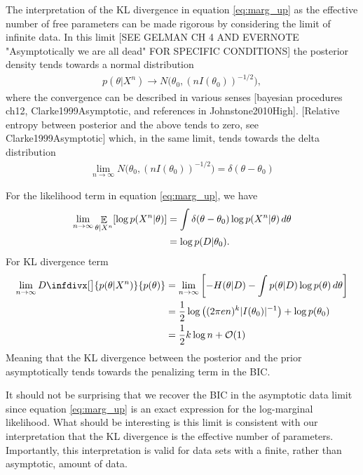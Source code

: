 \documentclass[10pt,a4paper]{article}
\DeclareMathOperator{\EX}{\mathbb{E}}%
\newcommand{\infdiv}{D\infdivx}
\begin{document}
The interpretation of the KL divergence in equation \ref{eq:marg_up}  as the effective number of free parameters can be made rigorous by considering the limit of infinite data. In this limit [SEE GELMAN CH 4 AND EVERNOTE "Asymptotically we are all dead" FOR SPECIFIC CONDITIONS] the posterior density tends towards a normal distribution
\begin{align}
p(\theta|X^n) \rightarrow N \big (\theta_0, (n I(\theta_0))^{-1/2} \big),
\end{align}
where the convergence can be described in various senses [bayesian procedures ch12, Clarke1999Asymptotic,  and references in Johnstone2010High]. [Relative entropy between posterior and the above tends to zero, see Clarke1999Asymptotic] which, in the same limit, tends towards the delta distribution
\begin{align}
\lim_{n\rightarrow\infty } N \big (\theta_0, (n I(\theta_0))^{-1/2} \big) = \delta(\theta - \theta_0)
\end{align}


 For the likelihood term in equation \ref{eq:marg_up}, we have
\begin{align}
\lim_{n\rightarrow\infty }\EX_{\theta | X^n} [ \log  p(X^n|\theta)]  &= \int \delta (\theta - \theta_0) \log  p(X^n|\theta) \, d\theta \notag\\
&= \log  p(D|\theta_0).
\end{align}
For KL divergence term
\begin{align}
\lim_{n\rightarrow\infty } \infdiv[\big]{p(\theta | X^n)}{p(\theta)} &= \lim_{n\rightarrow\infty } \left [ -H(\theta|D) - \int p(\theta|D) \log p(\theta) \, d\theta \right] \notag\\
&= \frac{1}{2} \log \left( (2\pi e n)^k  |I(\theta_0)|^{-1}\right) + \log p(\theta_0) \notag\\
&=  \frac{1}{2} k\log n + \mathcal{O}(1) 
\end{align}
Meaning that the KL divergence between the posterior and the prior asymptotically tends towards the penalizing term in the BIC.

It should not be surprising that we recover the BIC in the asymptotic data limit since equation \ref{eq:marg_up} is an exact expression for the log-marginal likelihood. What should be interesting is this limit is consistent with our interpretation that the KL divergence is the effective number of parameters. Importantly, this interpretation is valid for data sets with a finite, rather than asymptotic, amount of data.
\end{document}
